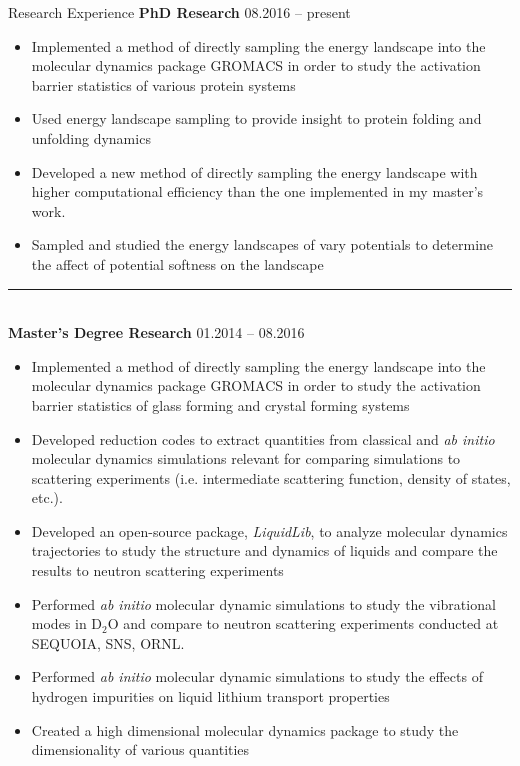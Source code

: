 \documentclass[9pt]{resume} %
\begin{document}
\begin{rSection}{Research Experience}
	{\bf PhD Research} \hfill {08.2016 -- present}
	\begin{itemize}\setlength\itemsep{-3pt}
		\item Implemented a method of directly sampling the energy landscape into the molecular dynamics package GROMACS in order to study the activation barrier statistics of various protein systems 
		\item Used energy landscape sampling to provide insight to protein folding and unfolding dynamics
		\item Developed a new method of directly sampling the energy landscape with higher computational efficiency than the one implemented in my master's work.
		\item Sampled and studied the energy landscapes of vary potentials to determine the affect of potential softness on the landscape
	\end{itemize}
	{\centering\noindent\rule{5cm}{0.4pt}}
	\\
	{\bf Master's Degree Research} \hfill {01.2014 -- 08.2016}
	\begin{itemize}\setlength\itemsep{-3pt}
		\item Implemented a method of directly sampling the energy landscape into the molecular dynamics package GROMACS in order to study the activation barrier statistics of glass forming and crystal forming systems
		\item Developed reduction codes to extract quantities from classical and \textit{ab initio} molecular dynamics simulations relevant for comparing simulations to scattering experiments (i.e. intermediate scattering function, density of states, etc.).
		\item Developed an open-source package, \textit{LiquidLib}, to analyze molecular dynamics trajectories to study the structure and dynamics of liquids and compare the results to neutron scattering experiments 
		\item Performed \textit{ab initio} molecular dynamic simulations to study the vibrational modes in D$_2$O and compare to neutron scattering experiments conducted at SEQUOIA, SNS, ORNL. 
		\item Performed \textit{ab initio} molecular dynamic simulations to study the effects of hydrogen impurities on liquid lithium transport properties
		\item Created a high dimensional molecular dynamics package to study the dimensionality of various quantities
	\end{itemize}

\end{rSection}
\end{document}
